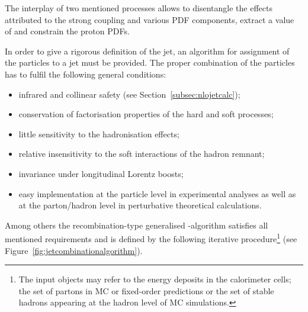 The interplay of two mentioned processes allows to disentangle the effects attributed to the strong coupling and various PDF components, extract a value of \asz and constrain the proton PDFs.

In order to give a rigorous definition of the jet, an algorithm for assignment of the particles to a jet must be provided. The proper combination of the particles has to fulfil the following general conditions:
\begin{itemize}
	\item infrared and collinear safety (see Section~\ref{subsec:nlojetcalc});
	\item conservation of factorisation properties of the hard and soft processes;
	\item little sensitivity to the hadronisation effects;
	\item relative insensitivity to the soft interactions of the hadron remnant;
	\item invariance under longitudinal Lorentz boosts;
	\item easy implementation at the particle level in experimental analyses as well as at the parton/hadron level in perturbative theoretical calculations.
\end{itemize}
Among others the recombination-type generalised \kt-algorithm satisfies all mentioned requirements and is defined by the following iterative procedure\footnote{The input objects may refer to the energy deposits in the calorimeter cells; the set of partons in MC or fixed-order predictions or the set of stable hadrons appearing at the hadron level of MC simulations.} (see Figure~\ref{fig:jetcombinationalgorithm}).
